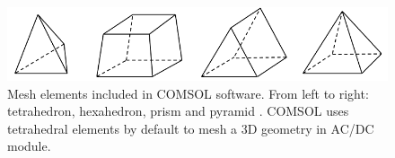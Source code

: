 \begin{figure}[ht]
	\includegraphics[width=\textwidth]{03_Prototype/figures/fig006_COMSOL_meshing_elements.png}
	\caption[3D Mesh elements included in COMSOL]{Mesh elements included in COMSOL software. From left to right: tetrahedron, hexahedron, prism and pyramid \cite{mesh2013}. COMSOL uses tetrahedral elements by default to mesh a 3D geometry in AC/DC module.}
	\label{chap3:COMSOL_meshing_elements}
\end{figure}
